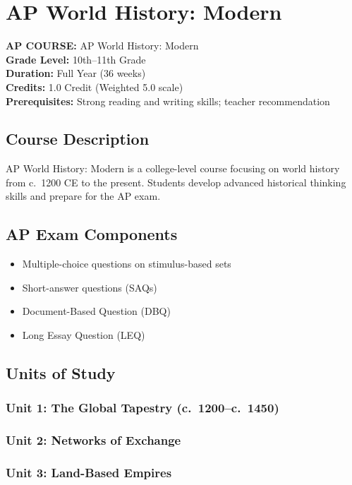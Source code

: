 \documentclass[12pt,oneside]{book}
\begin{document}
\chapter{AP World History: Modern}

\noindent\textbf{AP COURSE:} AP World History: Modern\\
\textbf{Grade Level:} 10th--11th Grade\\
\textbf{Duration:} Full Year (36 weeks)\\
\textbf{Credits:} 1.0 Credit (Weighted 5.0 scale)\\
\textbf{Prerequisites:} Strong reading and writing skills; teacher recommendation

\section{Course Description}
AP World History: Modern is a college-level course focusing on world history from c.\ 1200 CE
to the present. Students develop advanced historical thinking skills and prepare for the AP exam.

\section{AP Exam Components}
\begin{itemize}[leftmargin=2em]
    \item Multiple-choice questions on stimulus-based sets
    \item Short-answer questions (SAQs)
    \item Document-Based Question (DBQ)
    \item Long Essay Question (LEQ)
\end{itemize}

\section{Units of Study}
\subsection*{Unit 1: The Global Tapestry (c.\ 1200--c.\ 1450)}
\subsection*{Unit 2: Networks of Exchange}
\subsection*{Unit 3: Land-Based Empires}
\end{document}
